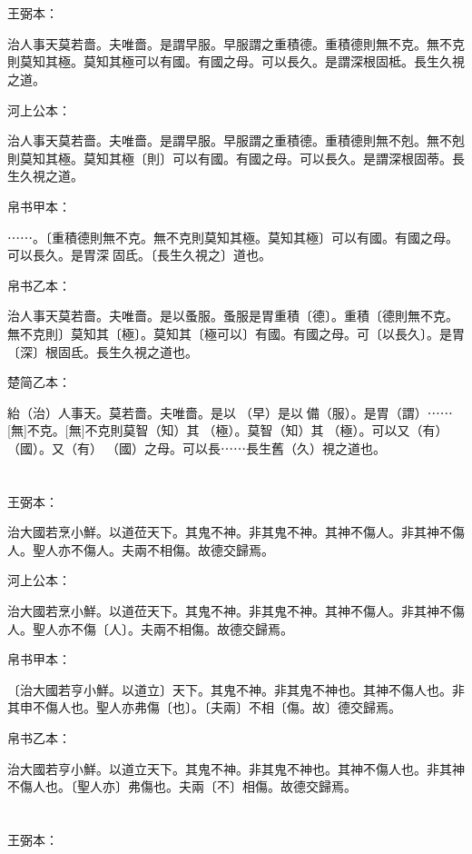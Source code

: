 \documentclass[a5paper]{ctexbook}
\begin{document}
    \chapter{}
    王弼本：

    治人事天莫若嗇。夫唯嗇。是謂早服。早服謂之重積德。重積德則無不克。無不克則莫知其極。莫知其極可以有國。有國之母。可以長久。是謂深根固柢。長生久視之道。

    河上公本：

    治人事天莫若嗇。夫唯嗇。是謂早服。早服謂之重積德。重積德則無不剋。無不剋則莫知其極。莫知其極〔則〕可以有國。有國之母。可以長久。是謂深根固蒂。長生久視之道。

    帛书甲本：

    ⋯⋯。〔重積德則無不克。無不克則莫知其極。莫知其極〕可以有國。有國之母。可以長久。是胃深󱁆固氐。〔長生久視之〕道也。

    帛书乙本：

    治人事天莫若嗇。夫唯嗇。是以蚤服。蚤服是胃重積〔德〕。重積〔德則無不克。無不克則〕莫知其〔極〕。莫知其〔極可以〕有國。有國之母。可〔以長久〕。是胃〔深〕根固氐。長生久視之道也。

    楚简乙本：

    紿（治）人事天。莫若嗇。夫唯嗇。是以󶵙（早）是以󶵙備（服）。是胃（謂）⋯⋯[無]不克。[無]不克則莫智（知）其𠄨（極）。莫智（知）其𠄨（極）。可以又（有）󼷜（國）。又（有）󼷜（國）之母。可以長⋯⋯長生舊（久）視之道也。

    \chapter{}
    王弼本：

    治大國若烹小鮮。以道莅天下。其鬼不神。非其鬼不神。其神不傷人。非其神不傷人。聖人亦不傷人。夫兩不相傷。故德交歸焉。

    河上公本：

    治大國若烹小鮮。以道莅天下。其鬼不神。非其鬼不神。其神不傷人。非其神不傷人。聖人亦不傷〔人〕。夫兩不相傷。故德交歸焉。

    帛书甲本：

    〔治大國若亨小鮮。以道立〕天下。其鬼不神。非其鬼不神也。其神不傷人也。非其申不傷人也。聖人亦弗傷〔也〕。〔夫兩〕不相〔傷。故〕德交歸焉。

    帛书乙本：

    治大國若亨小鮮。以道立天下。其鬼不神。非其鬼不神也。其神不傷人也。非其神不傷人也。〔聖人亦〕弗傷也。夫兩〔不〕相傷。故德交歸焉。

    \chapter{}
    王弼本：
\end{document}
